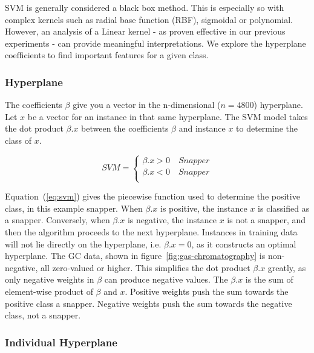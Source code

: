 \documentclass[runningheads]{llncs}
\begin{document}
SVM is generally considered a black box method. 
This is especially so with complex kernels such as radial base function (RBF), sigmoidal or polynomial. 
However, an analysis of a Linear kernel - as proven effective in our previous experiments - can provide meaningful interpretations. 
We explore the hyperplane coefficients to find important features for a given class. 

\subsubsection{Hyperplane}

The coefficients $\beta$ give you a vector in the n-dimensional ($n = 4800$) hyperplane.
Let $x$ be a vector for an instance in that same hyperplane.
The SVM model takes the dot product $\beta . x$ between the coefficients $\beta$ and instance $x$ to determine the class of $x$. 

\begin{equation}
  SVM  = \begin{cases} 
    \beta . x > 0 \quad Snapper \\
    \beta . x < 0 \quad Snapper \\
 \end{cases}
 \label{eq:svm}
\end{equation}

Equation~(\ref{eq:svm}) gives the piecewise function used to determine the positive class, in this example snapper. 
When $\beta . x$ is positive, the instance $x$ is classified as a snapper. 
Conversely, when $\beta . x$ is negative, the instance $x$ is not a snapper, and then the algorithm proceeds to the next hyperplane. 
Instances in training data will not lie directly on the hyperplane, i.e. $\beta . x = 0$, as it constructs an optimal hyperplane. 
The GC data, shown in figure~\ref{fig:gas-chromatography} is non-negative, all zero-valued or higher. 
This simplifies the dot product $\beta . x$ greatly, as only negative weights in $\beta$ can produce negative values.
The $\beta . x$ is the sum of element-wise product of $\beta$ and $x$. 
Positive weights push the sum towards the positive class a snapper. 
Negative weights push the sum towards the negative class, not a snapper. 

\subsubsection{Individual Hyperplane}
\end{document}
